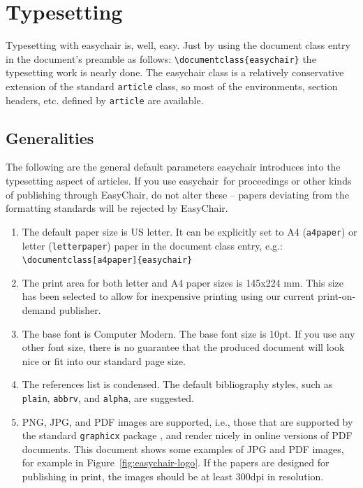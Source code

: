 \documentclass{easychair}
\newcommand{\easychair}{\textsf{easychair}}
\begin{document}
\section{Typesetting}
\label{sect:typesetting}

Typesetting with {\easychair} is, well, easy.  Just by using the
document class entry in the document's preamble as follows:
\verb+\documentclass{easychair}+ the typesetting work is nearly done.
The {\easychair} class is a relatively conservative extension of the
standard \texttt{article} class, so most of the environments, section
headers, etc. defined by \texttt{article} are available.

\subsection{Generalities}
\label{sect:generalities}

The following are the general default parameters {\easychair}
introduces into the typesetting aspect of articles. If you use
\easychair\ for proceedings or other kinds of publishing through
EasyChair, do not alter these -- papers deviating from the formatting
standards will be rejected by EasyChair.

\begin{enumerate}
\item
The default paper size is US letter. It can be explicitly set to A4 
(\texttt{a4paper}) or letter (\texttt{letterpaper}) paper in the
document class entry, e.g.:\\\verb+\documentclass[a4paper]{easychair}+

\item
The print area for both letter and A4 paper sizes is 145x224 mm. This size
has been selected to allow for inexpensive printing using our current
print-on-demand publisher.

\item
The base font is Computer Modern. The base font size is 10pt. If you
use any other font size, there is no guarantee that the produced
document will look nice or fit into our standard page size.

\item
The references list is condensed. The default bibliography styles, such as
\texttt{plain}, \texttt{abbrv}, and \texttt{alpha}, are suggested.

\item
PNG, JPG, and PDF images are supported, i.e., those that are supported
by the standard \texttt{graphicx} package \cite{graphicx-package}, and
render nicely in online versions of PDF documents.  This document
shows some examples of JPG and PDF images, for example in
Figure~\ref{fig:easychair-logo}. If the papers are designed for
publishing in print, the images should be at least 300dpi in
resolution. 

\end{enumerate}
\end{document}
